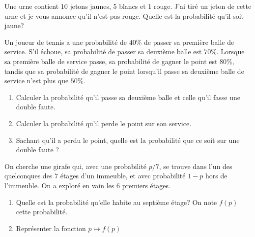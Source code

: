 \documentclass[a4paper,12pt,reqno]{amsart}
\begin{document}


\begin{exo}

  Une urne contient $10$ jetons jaunes, $5$ blancs et $1$ rouge. J'ai tiré un jeton de cette urne et je vous annonce qu'il n'est pas rouge. Quelle est la probabilité qu'il soit jaune?

\end{exo}

\begin{exo}

  Un joueur de tennis a une probabilité de $40\%$ de passer sa première balle de service. S'il échoue, sa probabilité de passer sa deuxième balle est $70\%$. Lorsque sa première balle de service passe, sa probabilité de gagner le point est $80\%$, tandis que sa probabilité de gagner le point lorsqu'il passe sa deuxième balle de service n'est plus que $50\%$.

  \begin{enumerate}
    \item Calculer la probabilité qu'il passe sa deuxième balle et celle qu'il fasse une double faute.
    \item Calculer la probabilité qu'il perde le point sur son service.
    \item Sachant qu'il a perdu le point, quelle est la probabilité que ce soit sur une double faute ?
  \end{enumerate}

\end{exo}

\begin{exo}

  On cherche une girafe qui, avec une probabilité $p/7$, se trouve dans l'un des quelconques des $7$ étages d'un immeuble, et avec probabilité $1-p$ hors de l'immeuble. On a exploré en vain les $6$ premiers étages.

  \begin{enumerate}
    \item Quelle est la probabilité qu'elle habite au  septième étage? On note $f(p)$ cette probabilité.
    \item Représenter  la fonction $p\mapsto f(p)$
  \end{enumerate}

\end{exo}
\end{document}
